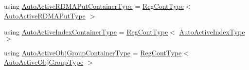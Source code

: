 \begin{DoxyCompactItemize}
\item 
using \hyperlink{namespacevt_1_1auto__registry_a7051002e8986239f9c5f986384ebec66}{Auto\+Active\+R\+D\+M\+A\+Put\+Container\+Type} = \hyperlink{namespacevt_1_1auto__registry_a988a4943e4c8fe82b56f5b13bddceb2b}{Reg\+Cont\+Type}$<$ \hyperlink{namespacevt_1_1auto__registry_a1f67d3efa37b61040b56258ca59df088}{Auto\+Active\+R\+D\+M\+A\+Put\+Type} $>$
\item 
using \hyperlink{namespacevt_1_1auto__registry_a892918ae7bc486701964f7e5e0bb0c8a}{Auto\+Active\+Index\+Container\+Type} = \hyperlink{namespacevt_1_1auto__registry_a988a4943e4c8fe82b56f5b13bddceb2b}{Reg\+Cont\+Type}$<$ \hyperlink{namespacevt_1_1auto__registry_ad5ff1c3344b954a1e1212c72c74e4a7a}{Auto\+Active\+Index\+Type} $>$
\item 
using \hyperlink{namespacevt_1_1auto__registry_a2328b4aa12baaa0b0fc0bf07ed2be755}{Auto\+Active\+Obj\+Group\+Container\+Type} = \hyperlink{namespacevt_1_1auto__registry_a988a4943e4c8fe82b56f5b13bddceb2b}{Reg\+Cont\+Type}$<$ \hyperlink{namespacevt_1_1auto__registry_a861d9d01e89c81f0a955188724aa25b3}{Auto\+Active\+Obj\+Group\+Type} $>$
\end{DoxyCompactItemize}
